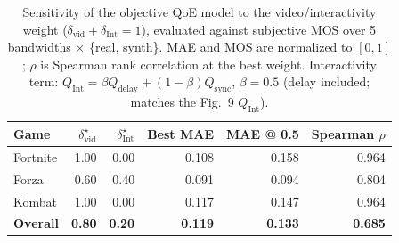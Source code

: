 \begin{table}[t]
  \centering
  \caption{Sensitivity of the objective QoE model to the video/interactivity weight ($\delta_{\mathrm{vid}}+\delta_{\mathrm{Int}}=1$), evaluated against subjective MOS over 5 bandwidths $\times$ \{real, synth\}. MAE and MOS are normalized to $[0,1]$; $\rho$ is Spearman rank correlation at the best weight. Interactivity term: $Q_{\mathrm{Int}}=\beta Q_{\mathrm{delay}}+(1-\beta)Q_{\mathrm{sync}}$, $\beta=0.5$ (delay included; matches the Fig.~9 $Q_{\mathrm{Int}}$).}
  \label{tab:weight-sensitivity-delay_inclusive}
  \begin{tabular}{lrrrrr}
    \toprule
    Game & $\delta_{\mathrm{vid}}^\star$ & $\delta_{\mathrm{Int}}^\star$ & Best MAE & MAE @ 0.5 & Spearman $\rho$ \\
    \midrule
    Fortnite & 1.00 & 0.00 & 0.108 & 0.158 & 0.964 \\
    Forza & 0.60 & 0.40 & 0.091 & 0.094 & 0.804 \\
    Kombat & 1.00 & 0.00 & 0.117 & 0.147 & 0.964 \\
    \midrule
    \textbf{Overall} & \textbf{0.80} & \textbf{0.20} & \textbf{0.119} & \textbf{0.133} & \textbf{0.685} \\
    \bottomrule
  \end{tabular}
\end{table}
